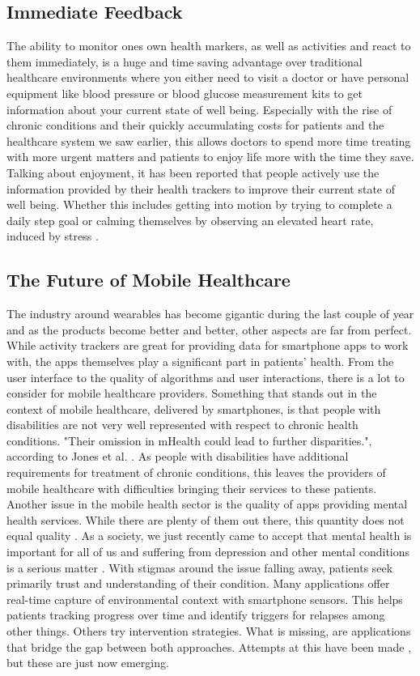 \subsection{Immediate Feedback}
The ability to monitor ones own health markers, as well as activities and react to them immediately, is a huge and time saving advantage over traditional healthcare environments where you either need to visit a doctor or have personal equipment like blood pressure or blood glucose measurement kits to get information about your current state of well being. Especially with the rise of chronic conditions and their quickly accumulating costs for patients and the healthcare system we saw earlier, this allows doctors to spend more time treating with more urgent matters and patients to enjoy life more with the time they save. Talking about enjoyment, it has been reported that people actively use the information provided by their health trackers to improve their current state of well being. Whether this includes getting into motion by trying to complete a daily step goal \cite{rasche2015activity} or calming themselves by observing an elevated heart rate, induced by stress \cite{mayya2015continuous}.
\subsection{The Future of Mobile Healthcare}
The industry around wearables has become gigantic during the last couple of year \cite{wearableMarket} and as the products become better and better, other aspects are far from perfect.
While activity trackers are great for providing data for smartphone apps to work with, the apps themselves play a significant part in patients' health. From the user interface to the quality of algorithms and user interactions, there is a lot to consider for mobile healthcare providers. Something that stands out in the context of mobile healthcare, delivered by smartphones, is that people with disabilities are not very well represented with respect to chronic health conditions. "Their omission in mHealth could lead to further disparities.", according to Jones et al. \cite{jones2018mobile}. As people with disabilities have additional requirements for treatment of chronic conditions, this leaves the providers of mobile healthcare with difficulties bringing their services to these patients. \\
Another issue in the mobile health sector is the quality of apps providing mental health services. While there are plenty of them out there, this quantity does not equal quality \cite{torous2017needed}. As a society, we just recently came to accept that mental health is important for all of us and suffering from depression and other mental conditions is a serious matter \cite{bharadwaj2017mental}. With stigmas around the issue falling away, patients seek primarily trust and understanding of their condition. Many applications offer real-time capture of environmental context with smartphone sensors. This helps patients tracking progress over time and identify triggers for relapses among other things. Others try intervention strategies. What is missing, are applications that bridge the gap between both approaches. Attempts at this have been made \cite{torous2019creating}, but these are just now emerging.
